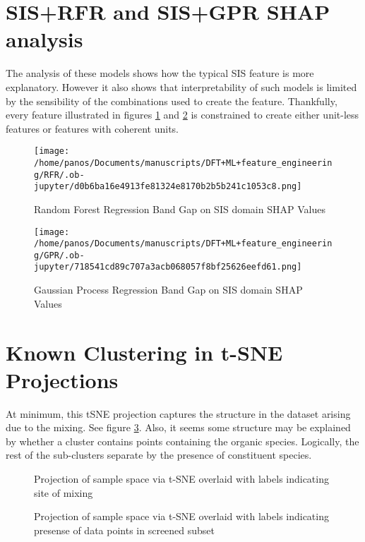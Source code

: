 \section*{SIS+RFR and SIS+GPR SHAP analysis}
\label{sec:org011016d}
The analysis of these models shows how the typical SIS feature is more explanatory.
However it also shows that interpretability of such models is limited by the sensibility of the combinations used to create the feature.
Thankfully, every feature illustrated in figures \ref{fig:rfrSHAPe} and \ref{fig:gprSHAPe} is constrained to create either unit-less features or features with coherent units.

\begin{figure}[htbp]
\centering
\texttt{[image: /home/panos/Documents/manuscripts/DFT+ML+feature\_engineering/RFR/.ob-jupyter/d0b6ba16e4913fe81324e8170b2b5b241c1053c8.png]}
\caption{\label{fig:rfrSHAPe} Random Forest Regression Band Gap on SIS domain SHAP Values}
\end{figure}

\begin{figure}[htbp]
\centering
\texttt{[image: /home/panos/Documents/manuscripts/DFT+ML+feature\_engineering/GPR/.ob-jupyter/718541cd89c707a3acb068057f8bf25626eefd61.png]}
\caption{\label{fig:gprSHAPe} Gaussian Process Regression Band Gap on SIS domain SHAP Values}
\end{figure}

\section*{Known Clustering in t-SNE Projections}
\label{sec:org9cb877b}
At minimum, this tSNE projection captures the structure in the dataset arising due to the mixing.
See figure \ref{fig:alloys}.
Also, it seems some structure may be explained by whether a cluster contains points containing the organic species.
Logically, the rest of the sub-clusters separate by the presence of constituent species.

 
\begin{figure}[htbp]
\centering

\caption{\label{fig:alloys} Projection of sample space via t-SNE overlaid with labels indicating site of mixing}
\end{figure}

 
\begin{figure}[htbp]
\centering

\caption{\label{fig:chosen} Projection of sample space via t-SNE overlaid with labels indicating presense of data points in screened subset}
\end{figure}

